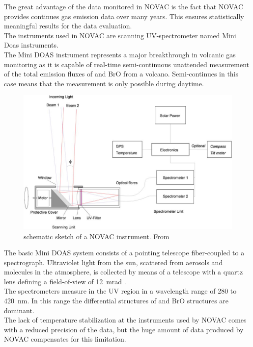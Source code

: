 		The great advantage of the data monitored in NOVAC is the fact that NOVAC provides continues gas emission data over many years. This ensures statistically meaningful results for the data evaluation.\\
		The instruments used in NOVAC are scanning UV-spectrometer named Mini Doas instruments. \\
		The  Mini DOAS  instrument  represents  a  major  breakthrough  in  volcanic  gas	monitoring as it is capable of real-time semi-continuous unattended measurement of the total emission fluxes of   and BrO from a volcano. Semi-continues in this case means that the measurement is only possible during daytime.\\
		\begin{figure}
			\centering
		 \includegraphics[width=1\textwidth]{Bilder/Simon/Bilder_Tung/NOVAC_Instrument}
			\caption{schematic sketch of a NOVAC instrument. From \cite{galle2010network}}
		\end{figure}
		The  basic  Mini DOAS  system  consists  of  a  pointing  telescope  fiber-coupled  to  a  spectrograph.  
		Ultraviolet light from the sun, scattered from aerosols and molecules in the atmosphere, is collected by 
		means  of  a  telescope  with  a  quartz  lens  defining  a  field-of-view  of  12~mrad
		\citep{NOVACsite}. \\
		The spectrometers measure in the UV region in a wavelength range of 280 to 420~nm. In this range the differential structures of  and BrO structures are dominant.\\
		The lack of temperature stabilization at the instruments used by NOVAC comes with a reduced precision of the data, but the huge amount of data produced by NOVAC compensates for this limitation.  
		

